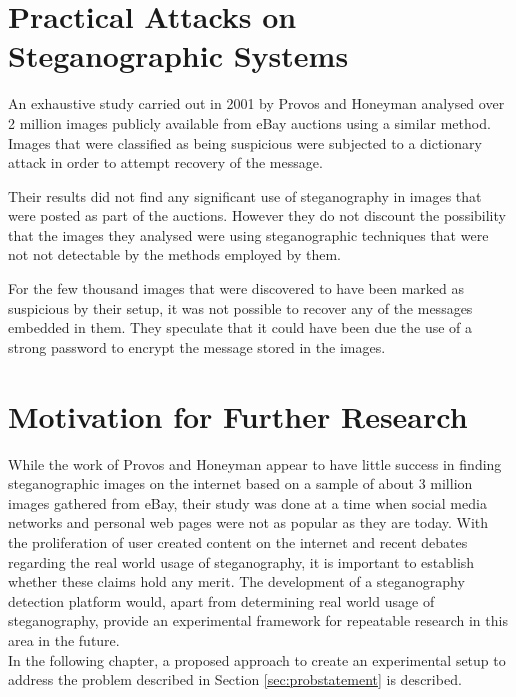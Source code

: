 \documentclass[12pt]{extreport}
\begin{document}
\section{Practical Attacks on Steganographic Systems}
\label{sec:practicalattacks}
An exhaustive study carried out in 2001 by Provos and Honeyman \cite{provos2001detecting} analysed over 2 million images publicly available from eBay auctions using a similar method. Images that were classified as being suspicious were subjected to a dictionary attack in order to attempt recovery of the message.
 \par Their results did not find any significant use of steganography in images that were posted as part of the auctions. However they do not discount the possibility that the images they analysed were using steganographic techniques that were not not detectable by the methods employed by them.
\par For the few thousand images that were discovered to have been marked as suspicious by their setup, it was not possible to recover any of the messages embedded in them.  They speculate that it could have been due the use of a strong password to encrypt the message stored in the images.
\section{Motivation for Further Research}
\label{sec:motivation}
While the work of Provos and Honeyman appear to have little success in finding steganographic images on the internet based on a sample of about 3 million images  \cite{provos2001detecting} gathered from eBay, their study was done at a time when social media networks and personal web pages were not as popular as they are today. With the proliferation of user created content on the internet and recent debates regarding the real world usage of steganography, it is important to establish whether these claims hold any merit. The development of a steganography detection platform would, apart from determining real world usage of steganography, provide an experimental framework for repeatable research in this area in the future.\\
In the following chapter, a proposed approach to create an experimental setup to address the problem described in Section \ref{sec:probstatement} is described. 
\end{document}
